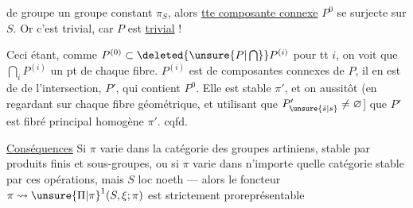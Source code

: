 de groupe un groupe constant $\pi_S$, alors
\uline{tte composante connexe} $P^0$ se surjecte sur $S$.
Or c'est trivial, car $P$ est \uline{trivial} !

Ceci étant, comme $P^{(0)}\subset\deleted{\unsure{P|\bigcap}}P^{(i)}$ pour tt $i$,
on voit que $\bigcap_i P^{(i)}$  un pt
de chaque fibre. 
  $P^{(i)}$ est  de
composantes connexes de $P$, il en est de
 de l'intersection,  $P'$, qui contient
$P^0$. Elle est stable  $\pi'$, et on 
aussitôt (en regardant sur chaque fibre
géométrique, et utilisant que $P'_{\unsure{\bar s|s}}\ne\varnothing$]
que $P'$ est fibré principal homogène  $\pi'$.
cqfd.

\uline{Conséquences} Si $\pi$ varie dans la  catégorie
des groupes artiniens, 
stable par produits finis et sous-groupes,
ou si $\pi$ varie dans n'importe quelle
catégorie stable par ces opérations, mais $S$
 loc noeth --- alors le foncteur
$\pi\leadsto\unsure{\Pi|\pi}^{1}(S,\xi;\pi)$ est strictement proreprésentable\unsure{$^{*}$|/}

